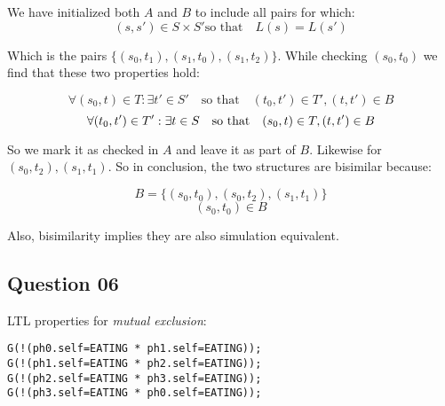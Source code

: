 \documentclass[a4paper]{article}
\begin{document}
We have initialized both $A$ and $B$ to include all pairs for which:
\[
(s,s') \in S \times S' \textrm{so that}\quad L(s) = L(s')
\]

Which is the pairs $\{(s_0,t_1),(s_1,t_0),(s_1,t_2)\}$. While checking $(s_0,t_0)$ we find that these two properties hold:

\[
\forall (s_0,t) \in T: \exists t' \in S' \quad\textrm{so that}\quad
  (t_0,t') \in T', (t,t') \in B
\]
\[
\forall (t_0,t') \in T': \exists t \in S \quad\textrm{so that}\quad
  (s_0,t) \in T, (t,t') \in B\\
\]

So we mark it as checked in $A$ and leave it as part of $B$. Likewise for
$(s_0,t_2),(s_1,t_1)$. So in conclusion, the two structures are bisimilar
because:

\[
B = \{(s_0,t_0),(s_0,t_2),(s_1,t_1)\}
\]
\[
(s_0,t_0) \in B
\]

Also, bisimilarity implies they are also simulation equivalent.

\subsection*{Question 06}


LTL properties for {\em mutual exclusion}:

\begin{lstlisting}
G(!(ph0.self=EATING * ph1.self=EATING));
G(!(ph1.self=EATING * ph2.self=EATING));
G(!(ph2.self=EATING * ph3.self=EATING));
G(!(ph3.self=EATING * ph0.self=EATING));
\end{lstlisting}
\end{document}
